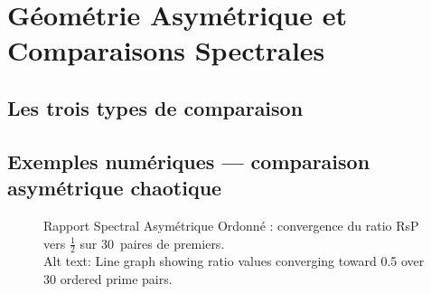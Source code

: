 \documentclass[]{pasj02}
\begin{document}
\section{Géométrie Asymétrique et Comparaisons Spectrales}
\label{sec:asymetrique}

\subsection{Les trois types de comparaison}
\label{ssec:types_comparaison}
\label{hol:rsp_asym_ordonnee}

\begin{table}
  \label{tab:comparaison}
\end{table}

\subsection{Exemples numériques --- comparaison asymétrique chaotique}
\label{ssec:chaotique}
\label{hol:rsp_asym_chaotique}

\begin{figure}
  \begin{center}
  \end{center}
  \caption{Rapport Spectral Asymétrique Ordonné : convergence du ratio RsP
    vers $\tfrac{1}{2}$ sur 30~paires de premiers.\\
    Alt text: Line graph showing ratio values converging toward 0.5 over 30
    ordered prime pairs.}
  \label{fig:rsp_ordonne}
\end{figure}
\end{document}

